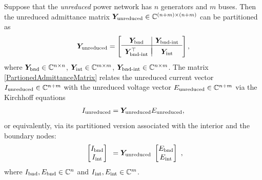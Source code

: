 \documentclass[10pt,twocolumn]{IEEEtran}
\begin{document}
Suppose that the \emph{unreduced} power network has $n$ generators and $m$ buses. Then the unreduced admittance matrix $\bm{Y}_{\rm{unreduced}}\in \mathbb{C}^{(n+m)\times(n+m)}$ can be partitioned as
\begin{align}
\bm{Y}_{\rm{unreduced}} = \begin{bmatrix} 
\begin{array}{c|c}
\bm{Y}_{\rm{bnd}} & \bm{Y}_{\rm{bnd{\text{-}}int}} \\
\hline\vspace*{-0.12in}\\
\bm{Y}_{\rm{bnd{\text{-}}int}}^{\top} & \bm{Y}_{\rm{int}}
\end{array}	
 \end{bmatrix},
\label{PartionedAdmittanceMatrix}	
\end{align} 
where $\bm{Y}_{\rm{bnd}}\in\mathbb{C}^{n\times n}$, $\bm{Y}_{\rm{int}}\in\mathbb{C}^{m\times m}$, $\bm{Y}_{\rm{bnd{\text{-}}int}}\in\mathbb{C}^{n\times m}$. The matrix \eqref{PartionedAdmittanceMatrix} relates the unreduced current vector $I_{\rm{unreduced}}\in\mathbb{C}^{n+m}$ with the unreduced voltage vector $E_{\rm{unreduced}}\in\mathbb{C}^{n+m}$ via the Kirchhoff equations
\begin{align}
I_{\rm{unreduced}} = \bm{Y}_{\rm{unreduced}} E_{\rm{unreduced}},
\label{DefUnreducedY}	
\end{align}
or equivalently, via its partitioned version associated with the interior and the boundary nodes:
\begin{align}
\begin{array}{c}
\begin{bmatrix}
I_{\rm{bnd}}\\
I_{\rm{int}} 	
\end{bmatrix}	
\end{array} = \bm{Y}_{\rm{unreduced}} \begin{array}{c}
\begin{bmatrix}
E_{\rm{bnd}}\\
E_{\rm{int}} 	
\end{bmatrix}	
\end{array},
\label{PartitionedKirchoffEquation}	
\end{align}
where $I_{\rm{bnd}},E_{\rm{bnd}}\in\mathbb{C}^{n}$ and $I_{\rm{int}},E_{\rm{int}}\in\mathbb{C}^{m}$.
\end{document}
